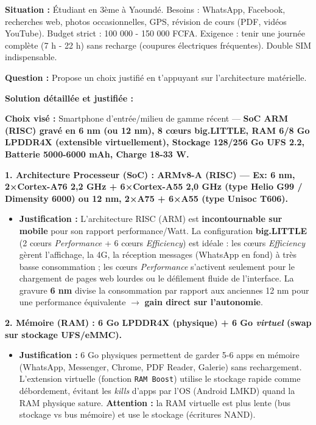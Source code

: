 \documentclass[11pt]{article}
\newcommand{\cle}[1]{{\popxbold\color{popdark}#1}}
\begin{document}
\begin{exoresolu}
\textbf{Situation :} Étudiant en 3ème à Yaoundé. Besoins : WhatsApp, Facebook, recherches web, photos occasionnelles, GPS, révision de cours (PDF, vidéos YouTube). Budget strict : 100 000 - 150 000 FCFA. Exigence : tenir une journée complète (7 h - 22 h) sans recharge (coupures électriques fréquentes). Double SIM indispensable.

\textbf{Question :} Propose un choix justifié en t'appuyant sur l'architecture matérielle.

\tcblower

\textbf{Solution détaillée et justifiée :}

\textbf{Choix visé :} Smartphone d'entrée/milieu de gamme récent — \textbf{SoC ARM (RISC) gravé en 6 nm (ou 12 nm), 8 cœurs big.LITTLE, RAM 6/8 Go LPDDR4X (extensible virtuellement), Stockage 128/256 Go UFS 2.2, Batterie 5000-6000 mAh, Charge 18-33 W.}

\textbf{1. Architecture Processeur (SoC) : ARMv8-A (RISC) — Ex: 6 nm, 2×Cortex-A76 2,2 GHz + 6×Cortex-A55 2,0 GHz (type Helio G99 / Dimensity 6000) ou 12 nm, 2×A75 + 6×A55 (type Unisoc T606).}
\begin{itemize}
    \item \textbf{Justification :} L'architecture \cle{RISC} (ARM) est \textbf{incontournable sur mobile} pour son rapport performance/Watt. La configuration \textbf{big.LITTLE} (2 cœurs \emph{Performance} + 6 cœurs \emph{Efficiency}) est idéale : les cœurs \emph{Efficiency} gèrent l'affichage, la 4G, la réception messages (WhatsApp en fond) à très basse consommation ; les cœurs \emph{Performance} s'activent seulement pour le chargement de pages web lourdes ou le défilement fluide de l'interface. La gravure \textbf{6 nm} divise la consommation par rapport aux anciennes 12 nm pour une performance équivalente $\rightarrow$ \textbf{gain direct sur l'autonomie}.
\end{itemize}

\textbf{2. Mémoire (RAM) : 6 Go LPDDR4X (physique) + 6 Go \emph{virtuel} (swap sur stockage UFS/eMMC).}
\begin{itemize}
    \item \textbf{Justification :} 6 Go physiques permettent de garder 5-6 apps en mémoire (WhatsApp, Messenger, Chrome, PDF Reader, Galerie) sans rechargement. L'extension virtuelle (fonction \texttt{RAM Boost}) utilise le stockage rapide comme débordement, évitant les \emph{kills} d'apps par l'OS (Android LMKD) quand la RAM physique sature. \textbf{Attention :} la RAM virtuelle est plus lente (bus stockage vs bus mémoire) et use le stockage (écritures NAND).
\end{itemize}


\end{exoresolu}
\end{document}
